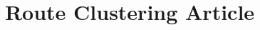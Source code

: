 \documentclass{article}
\begin{document}
\title{Route Clustering Article}
\maketitle

\printbibliography
\end{document}
